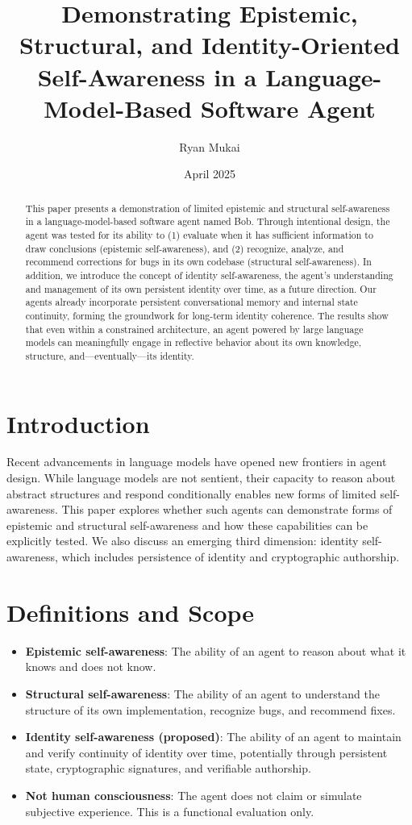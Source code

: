 \documentclass[11pt]{article}
\title{Demonstrating Epistemic, Structural, and Identity-Oriented Self-Awareness in a Language-Model-Based Software Agent}
\author{Ryan Mukai}
\date{April 2025}
\begin{document}
\maketitle

\begin{abstract}
This paper presents a demonstration of limited epistemic and structural self-awareness in a language-model-based software agent named Bob. Through intentional design, the agent was tested for its ability to (1) evaluate when it has sufficient information to draw conclusions (epistemic self-awareness), and (2) recognize, analyze, and recommend corrections for bugs in its own codebase (structural self-awareness). In addition, we introduce the concept of identity self-awareness, the agent's understanding and management of its own persistent identity over time, as a future direction. Our agents already incorporate persistent conversational memory and internal state continuity, forming the groundwork for long-term identity coherence. The results show that even within a constrained architecture, an agent powered by large language models can meaningfully engage in reflective behavior about its own knowledge, structure, and—eventually—its identity.
\end{abstract}

\section{Introduction}
Recent advancements in language models have opened new frontiers in agent design. While language models are not sentient, their capacity to reason about abstract structures and respond conditionally enables new forms of limited self-awareness. This paper explores whether such agents can demonstrate forms of epistemic and structural self-awareness and how these capabilities can be explicitly tested. We also discuss an emerging third dimension: identity self-awareness, which includes persistence of identity and cryptographic authorship.

\section{Definitions and Scope}
\begin{itemize}
    \item \textbf{Epistemic self-awareness}: The ability of an agent to reason about what it knows and does not know.
    \item \textbf{Structural self-awareness}: The ability of an agent to understand the structure of its own implementation, recognize bugs, and recommend fixes.
    \item \textbf{Identity self-awareness (proposed)}: The ability of an agent to maintain and verify continuity of identity over time, potentially through persistent state, cryptographic signatures, and verifiable authorship.
    \item \textbf{Not human consciousness}: The agent does not claim or simulate subjective experience. This is a functional evaluation only.
\end{itemize}
\end{document}

